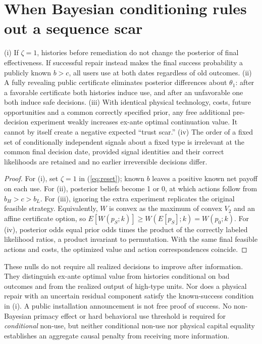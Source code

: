 \section{When Bayesian conditioning rules out a sequence scar}\label{sec:impossibility}
\begin{proposition}\label{prop:impossible}
(i) If $\zeta=1$, histories before remediation do not change the posterior of final effectiveness. If successful repair instead makes the final success probability a publicly known $b>c$, all users use at both dates regardless of old outcomes. (ii) A fully revealing public certificate eliminates posterior differences about $\theta_1$: after a favorable certificate both histories induce use, and after an unfavorable one both induce safe decisions. (iii) With identical physical technology, costs, future opportunities and a common correctly specified prior, any free additional pre-decision experiment weakly increases ex-ante optimal continuation value. It cannot by itself create a negative expected ``trust scar.'' (iv) The order of a fixed set of conditionally independent signals about a fixed type is irrelevant at the common final decision date, provided signal identities and their correct likelihoods are retained and no earlier irreversible decisions differ.
\end{proposition}
\begin{proof}
For (i), set $\zeta=1$ in (\ref{eq:reset}); known $b$ leaves a positive known net payoff on each use. For (ii), posterior beliefs become 1 or 0, at which actions follow from $b_H>c>b_L$. For (iii), ignoring the extra experiment replicates the original feasible strategy. Equivalently, $W$ is convex as the maximum of convex $V_2$ and an affine certificate option, so $E[W(p_S;k)]\geq W(E[p_S];k)=W(p_0;k)$. For (iv), posterior odds equal prior odds times the product of the correctly labeled likelihood ratios, a product invariant to permutation. With the same final feasible actions and costs, the optimized value and action correspondences coincide.
\end{proof}
These nulls do not require all realized decisions to improve after information. They distinguish ex-ante optimal value from histories conditional on bad outcomes and from the realized output of high-type units. Nor does a physical repair with an uncertain residual component satisfy the known-success condition in (i). A public installation announcement is not free proof of success. No non-Bayesian primacy effect or hard behavioral use threshold is required for \emph{conditional} non-use, but neither conditional non-use nor physical capital equality establishes an aggregate causal penalty from receiving more information.

